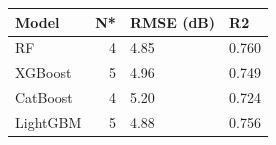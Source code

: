 \begin{tabular}{lrll}
\toprule
Model & N* & RMSE (dB) & R2 \\
\midrule
RF & 4 & 4.85 & 0.760 \\
XGBoost & 5 & 4.96 & 0.749 \\
CatBoost & 4 & 5.20 & 0.724 \\
LightGBM & 5 & 4.88 & 0.756 \\
\bottomrule
\end{tabular}
